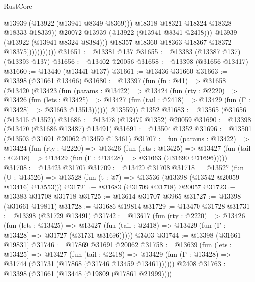 \begin{lexlean}{RustCore}
\begin{coremodule}
                                    @13939
                                    (@13922 (@13941 @8349 @8369)))
                                  @18318
                                  @18321
                                  @18324
                                  @18328
                                  @18333
                                  @18339))
                              @20072
                              @13939
                              (@13922 (@13941 @8341 @2408)))
                            @13939
                            (@13922 (@13941 @8324 @8384)))
                          @18357
                          @18360
                          @18363
                          @18367
                          @18372
                          @18375)))))))))))
@31651 := @13381 @137
@31655 := @13383 (@13387 @137) (@13393 @137)
@31656 := @13402 @20056
@31658 := @13398 (@31656 @13417)
@31660 := @13440 (@13441 @137)
@31661 := @13436 @31660
@31663 := @13398 (@31661 @13466)
@31680 := @13397
    (fun (fn : @41) =>
    @31658
      (@13420
        (@13423
          (fun (params : @13422) =>
          @13424
            (fun (rty : @2220) =>
            @13426
              (fun (lets : @13425) =>
              @13427 (fun (tail : @2418) => @13429 (fun (Γ : @13428) => @31663 @13513))))))
        @13559))
    @1352
@31683 := @13565 (@31656 (@13415 @1352))
@31686 := @13478 (@13479 @1352) @20059
@31690 := @13398 (@13470 (@31686 @13487) @13491)
@31691 := @13504 @1352
@31696 := @13501 (@13503 @31691 @20062 @13459 @13461)
@31707 := fun (params : @13422) =>
  @13424
    (fun (rty : @2220) =>
    @13426
      (fun (lets : @13425) =>
      @13427 (fun (tail : @2418) => @13429 (fun (Γ : @13428) => @31663 (@31690 @31696)))))
@31708 := @13423 @31707
@31709 := @13420 @31708
@31718 := @13527
    (fun (U : @13526) => @13528 (fun (t : @7) => @13536 (@13398 (@13542 @20059 @13416) @13553)))
@31721 := @31683 (@31709 @31718) @20057
@31723 := @13383 @31708 @31718
@31725 := @13614 @31707 @3965
@31727 := @13398 (@31661 @19811)
@31728 := @31686 @19814
@31729 := @13470 @31728
@31731 := @13398 (@31729 @13491)
@31742 := @13617
    (fun (rty : @2220) =>
    @13426
      (fun (lets : @13425) =>
      @13427 (fun (tail : @2418) => @13429 (fun (Γ : @13428) => @31727 (@31731 @31696)))))
    @3403
@31744 := @13398 (@31661 @19831)
@31746 := @17869 @31691 @20062
@31758 := @13639
    (fun (lets : @13425) =>
    @13427
      (fun (tail : @2418) =>
      @13429 (fun (Γ : @13428) => @31744 (@31731 (@17868 (@31746 @13459 @13461))))))
    @2408
@31763 := @13398 (@31661 (@13448 (@19809 (@17861 @21999))))

\end{coremodule}
\end{lexlean}
